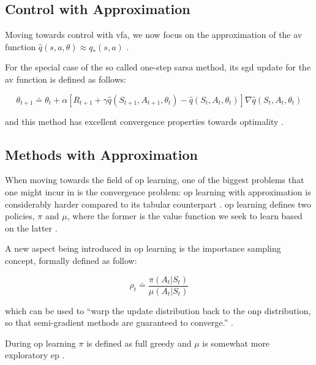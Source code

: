 \subsection{ Control with Approximation}
\label{subsec:onpol_control}

Moving towards control with \gls{vfa}, we now focus on the approximation of the \gls{av} function $\hat{q} (s,a,\theta) \approx q_* (s,a)$ \citep[p. 229]{Sutton2017}.

For the special case of the so called one-step \gls{sarsa} method, its \gls{sgd} update for the \gls{av} function is defined as follows:

\begin{equation}
	\theta_{t+1} \doteq \theta_t + \alpha [ R_{t+1} + \gamma \hat{q} (S_{t+1}, A_{t+1}, \theta_t) - \hat{q} (S_t, A_t, \theta_t) ] \nabla \hat{q} (S_t, A_t, \theta_t)
\end{equation}

and this method has excellent convergence properties towards optimality \citep[p. 230]{Sutton2017}.

\subsection{ Methods with Approximation}
\label{subsec:offpol_methods}

When moving towards the field of \gls{op} learning, one of the biggest problems that one might incur in is the convergence problem: \gls{op} learning with approximation is considerably harder compared to its tabular counterpart \citep[p. 243]{Sutton2017}. \gls{op} learning defines two policies, $\pi$ and $\mu$, where the former is the value function we seek to learn based on the latter \citep[p. 243]{Sutton2017}.

A new aspect being introduced in \gls{op} learning is the importance sampling concept, formally defined as follow:

\begin{equation}
\label{eq:importance_sampling}
	\rho_t \doteq \frac{\pi(A_t|S_t)}{\mu(A_t|S_t)}
\end{equation}

which can be used to ``warp the update distribution back to the \gls{onp} distribution, so that semi-gradient methods are guaranteed to converge.'' \citep[p. 243]{Sutton2017}.

During \gls{op} learning $\pi$ is defined as full greedy and $\mu$ is somewhat more exploratory \gls{ep} \citep[p. 243]{Sutton2017}.

